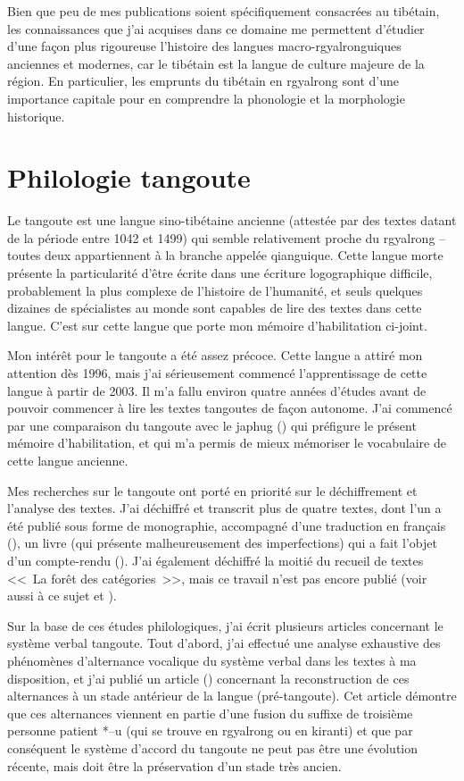 \documentclass[oldfontcommands,oneside,a4paper,11pt]{memoir}
\begin{document}
Bien que peu de mes publications soient spécifiquement consacrées au tibétain, les connaissances que j’ai acquises dans ce domaine me permettent d’étudier d’une façon plus rigoureuse l’histoire des langues macro-rgyalronguiques anciennes et modernes, car le tibétain est la langue de culture majeure de la région. En particulier, les emprunts du tibétain en rgyalrong sont d'une importance capitale pour en comprendre la phonologie et la morphologie historique.

\section{Philologie tangoute}
	Le tangoute est une langue sino-tibétaine ancienne (attestée par des textes datant de la période entre 1042 et 1499) qui semble relativement proche du rgyalrong – toutes deux appartiennent à la branche appelée qianguique. Cette langue morte présente la particularité d’être écrite dans une écriture logographique difficile, probablement la plus complexe de l’histoire de l’humanité, et seuls quelques dizaines de spécialistes au monde sont capables de lire des textes dans cette langue. C'est sur cette langue que porte mon mémoire d'habilitation ci-joint.
	
	Mon intérêt pour le tangoute a été assez précoce. Cette langue a attiré mon attention dès 1996, mais j'ai sérieusement commencé l'apprentissage de cette langue à partir de 2003. Il m'a fallu environ quatre années d'études avant de pouvoir commencer à lire les textes tangoutes de façon autonome. J'ai commencé par une comparaison du tangoute avec le japhug (\citealt{jacques06comparaison}) qui préfigure le présent mémoire d'habilitation, et qui m'a permis de mieux mémoriser le vocabulaire de cette langue ancienne.
	
	Mes recherches sur le tangoute ont porté en priorité sur le déchiffrement et l’analyse des textes. J’ai déchiffré et transcrit plus de quatre textes, dont l’un a été publié sous forme de monographie, accompagné d’une traduction en français (\citealt{jacques07textes}), un livre (qui présente malheureusement des imperfections) qui a fait l'objet d'un compte-rendu (\citealt{zaitsev09}). J'ai également déchiffré la moitié du recueil de textes <<~La forêt des catégories~>>, mais ce travail n'est pas encore publié (voir aussi à ce sujet \citealt{kepping83} et \citealt{leilin90}).
	

	Sur la base de ces études philologiques, j’ai écrit plusieurs articles concernant le système verbal tangoute. Tout d’abord, j’ai effectué une analyse exhaustive des phénomènes d’alternance vocalique du système verbal dans les textes à ma disposition, et j'ai publié un article (\citealt{jacques09tangutverb}) concernant la reconstruction de ces alternances à un stade antérieur de la langue (pré-tangoute). Cet article démontre que ces alternances viennent en partie d'une fusion du suffixe de troisième personne patient *--u (qui se trouve en rgyalrong ou en kiranti) et  que par conséquent  le système d'accord du tangoute ne peut pas être une évolution récente, mais doit être la préservation d'un stade très ancien.
	
\end{document}
